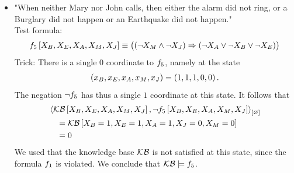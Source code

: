 \documentclass{scrartcl}
\begin{document}
{\begin{itemize}
            and
            \begin{align*}
                \contraction{
                    \formulaofat{0}{\catvariableof{B},\catvariableof{E},\catvariableof{A}},
                    \formulaofat{1}{\catvariableof{A},\catvariableof{M},\catvariableof{J}},
                    \formulaofat{2}{\catvariableof{J}},
                    \lnot\formulaofat{4}{\catvariableof{A},\catvariableof{M},\catvariableof{J}}}
                = 0 \, .
            \end{align*}
            We conclude that $\kb\models\formulaof{4}$.
            \item "When neither Mary nor John calls, then either the alarm did not ring, or a Burglary did not happen or an Earthquake did not happen."\\
            Test formula:
            \begin{align*}
                f_{5}\left[X_{B},X_{E},X_{A},X_{M},X_{J}\right]
                \equiv \big((\lnot X_{M}\land\lnot X_{J})\Rightarrow(\lnot X_{A}\lor\lnot X_{B}\lor\lnot X_{E})\big)
            \end{align*}
            Trick: There is a single $0$ coordinate to $f_{5}$, namely at the state
            \begin{align*}
                (x_{B},x_{E},x_{A},x_{M},x_{J}) = (1,1,1,0,0) \, .
            \end{align*}
            The negation $\lnot f_{5}$ has thus a single $1$ coordinate at this state.
            It follows that
            \begin{align*}
                & \left\langle 
                    \mathcal{KB}\left[X_{B},X_{E},X_{A},X_{M},X_{J}\right],
                    \lnot f_{5}\left[X_{B},X_{E},X_{A},X_{M},X_{J}\right]
                \right\rangle_{\left[ \varnothing \right]} \\
                &\quad= \mathcal{KB}\left[X_{B}=1,X_{E}=1,X_{A}=1,X_{J}=0,X_{M}=0\right] \\
                &\quad= 0
            \end{align*}
            We used that the knowledge base $\mathcal{KB}$ is not satisfied at this state, since the formula $f_{1}$ is violated.
            We conclude that $\mathcal{KB}\models f_{5}$.
        \end{itemize}
    }
\end{document}
